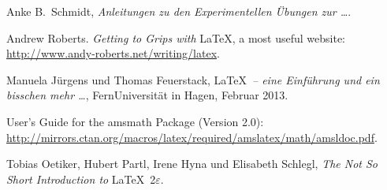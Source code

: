 \documentclass[
	fontsize=11pt,
	paper=a4,
	pagesize=auto,
	parskip=half,
	titlepage=on,
	ngerman
]{scrartcl}
\begin{document}
\begin{thebibliography}{9} %

Anke B.~Schmidt, \emph{Anleitungen zu den Experimentellen Übungen zur \ldots}.

Andrew Roberts. \emph{Getting to Grips with} \LaTeX, a most useful website: \url{http://www.andy-roberts.net/writing/latex}.

Manuela Jürgens und Thomas Feuerstack, \LaTeX\ \emph{-- eine Einführung und ein bisschen mehr \ldots}, FernUniversität in Hagen, Februar 2013.

User’s Guide for the amsmath Package (Version 2.0): \url{http://mirrors.ctan.org/macros/latex/required/amslatex/math/amsldoc.pdf}.

Tobias Oetiker, Hubert Partl, Irene Hyna und Elisabeth Schlegl, \emph{The Not So Short Introduction to} \LaTeX\ 2$\varepsilon$.

\end{thebibliography}
\end{document}
